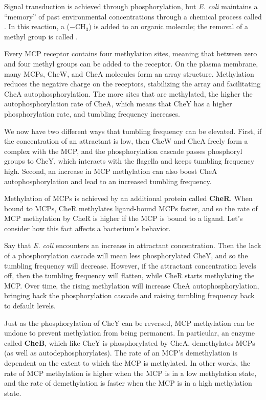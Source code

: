 Signal transduction is achieved through phosphorylation, but \textit{E. coli} maintains a ``memory'' of past environmental concentrations through a chemical process called . In this reaction, a  ($-\text{CH}_3$) is added to an organic molecule; the removal of a methyl group is called .

Every MCP receptor contains four methylation sites, meaning that between zero and four methyl groups can be added to the receptor. On the plasma membrane, many MCPs, CheW, and CheA molecules form an array structure. Methylation reduces the negative charge on the receptors, stabilizing the array and facilitating CheA autophosphorylation. The more sites that are methylated, the higher the autophosphorylation rate of CheA, which means that CheY has a higher phosphorylation rate, and tumbling frequency increases.

We now have two different ways that tumbling frequency can be elevated. First, if the concentration of an attractant is low, then CheW and CheA freely form a complex with the MCP, and the phosphorylation cascade passes phosphoryl groups to CheY, which interacts with the flagella and keeps tumbling frequency high. Second, an increase in MCP methylation can also boost CheA autophosphorylation and lead to an increased tumbling frequency.

Methylation of MCPs is achieved by an additional protein called \textbf{CheR}. When bound to MCPs, CheR methylates ligand-bound MCPs faster, and so the rate of MCP methylation by CheR is higher if the MCP is bound to a ligand. Let's consider how this fact affects a bacterium's behavior.

Say that \textit{E. coli} encounters an increase in attractant concentration. Then the lack of a phosphorylation cascade will mean less phosphorylated CheY, and so the tumbling frequency will decrease. However, if the attractant concentration levels off, then the tumbling frequency will flatten, while CheR starts methylating the MCP. Over time, the rising methylation will increase CheA autophosphorylation, bringing back the phosphorylation cascade and raising tumbling frequency back to default levels.

Just as the phosphorylation of CheY can be reversed, MCP methylation can be undone to prevent methylation from being permanent. In particular, an enzyme called \textbf{CheB}, which like CheY is phosphorylated by CheA, demethylates MCPs (as well as autodephosphorylates). The rate of an MCP's demethylation is dependent on the extent to which the MCP is methylated. In other words, the rate of MCP methylation is higher when the MCP is in a low methylation state, and the rate of demethylation is faster when the MCP is in a high methylation state.

